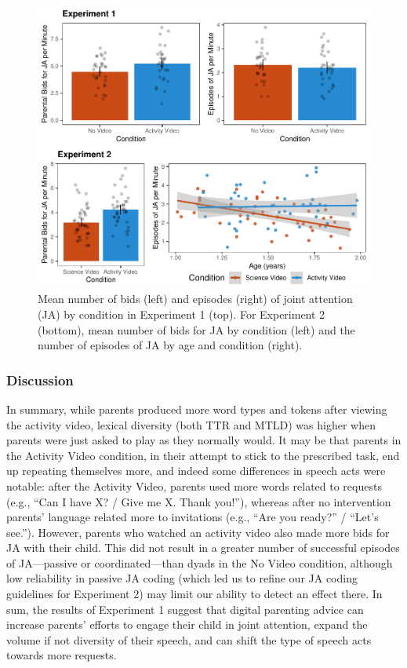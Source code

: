 \documentclass[
  english,
  man]{apa6}
\begin{document}
\begin{figure}[H]

{\centering \includegraphics{figs/fig-JA-1} 

}

\caption{\label{fig:JA} Mean number of bids (left) and episodes (right) of joint attention (JA) by condition in Experiment 1 (top). For Experiment 2 (bottom), mean number of bids for JA by condition (left) and the number of episodes of JA by age and condition (right).}\label{fig:fig-JA}
\end{figure}

\hypertarget{discussion}{%
\subsubsection{Discussion}\label{discussion}}

In summary, while parents produced more word types and tokens after viewing the activity video, lexical diversity (both TTR and MTLD) was higher when parents were just asked to play as they normally would.
It may be that parents in the Activity Video condition, in their attempt to stick to the prescribed task, end up repeating themselves more, and indeed some differences in speech acts were notable:
after the Activity Video, parents used more words related to requests (e.g., \enquote{Can I have X? / Give me X. Thank you!}), whereas after no intervention parents' language related more to invitations (e.g., \enquote{Are you ready?} / \enquote{Let's see.}).
However, parents who watched an activity video also made more bids for JA with their child.
This did not result in a greater number of successful episodes of JA---passive or coordinated---than dyads in the No Video condition, although low reliability in passive JA coding (which led us to refine our JA coding guidelines for Experiment 2) may limit our ability to detect an effect there.
In sum, the results of Experiment 1 suggest that digital parenting advice can increase parents' efforts to engage their child in joint attention, expand the volume if not diversity of their speech, and can shift the type of speech acts towards more requests.
\end{document}
